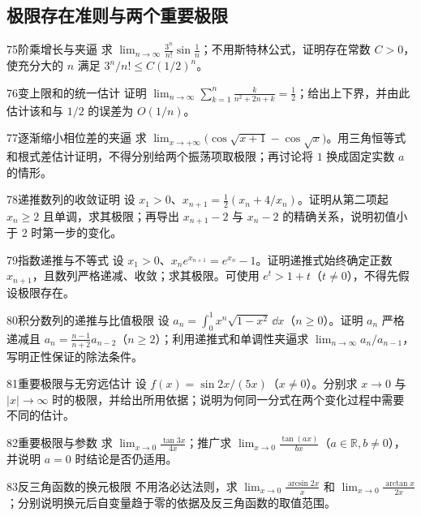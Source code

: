 \subsection{极限存在准则与两个重要极限}
\begin{exercise}{75}{阶乘增长与夹逼}
求 $\lim_{n\to\infty}\frac{3^n}{n!}\sin\frac1n$；不用斯特林公式，证明存在常数 $C>0$，使充分大的 $n$ 满足 $3^n/n!\le C(1/2)^n$。
\end{exercise}
\begin{exercise}{76}{变上限和的统一估计}
证明 $\lim_{n\to\infty}\sum_{k=1}^n\frac{k}{n^2+2n+k}=\frac12$；给出上下界，并由此估计该和与 $1/2$ 的误差为 $O(1/n)$。
\end{exercise}
\begin{exercise}{77}{逐渐缩小相位差的夹逼}
求 $\lim_{x\to+\infty}\bigl(\cos\sqrt{x+1}-\cos\sqrt x\bigr)$。用三角恒等式和根式差估计证明，不得分别给两个振荡项取极限；再讨论将 $1$ 换成固定实数 $a$ 的情形。
\end{exercise}
\begin{exercise}{78}{递推数列的收敛证明}
设 $x_1>0$、$x_{n+1}=\frac12(x_n+4/x_n)$。证明从第二项起 $x_n\ge2$ 且单调，求其极限；再导出 $x_{n+1}-2$ 与 $x_n-2$ 的精确关系，说明初值小于 $2$ 时第一步的变化。
\end{exercise}
\begin{exercise}{79}{指数递推与不等式}
设 $x_1>0$、$x_ne^{x_{n+1}}=e^{x_n}-1$。证明递推式始终确定正数 $x_{n+1}$，且数列严格递减、收敛；求其极限。可使用 $e^t>1+t$（$t\ne0$），不得先假设极限存在。
\end{exercise}
\begin{exercise}{80}{积分数列的递推与比值极限}
设 $a_n=\int_0^1x^n\sqrt{1-x^2}\,\dd x$（$n\ge0$）。证明 $a_n$ 严格递减且 $a_n=\frac{n-1}{n+2}a_{n-2}$（$n\ge2$）；利用递推式和单调性夹逼求 $\lim_{n\to\infty}a_n/a_{n-1}$，写明正性保证的除法条件。
\end{exercise}
\begin{exercise}{81}{重要极限与无穷远估计}
设 $f(x)=\sin2x/(5x)$（$x\ne0$）。分别求 $x\to0$ 与 $|x|\to\infty$ 时的极限，并给出所用依据；说明为何同一分式在两个变化过程中需要不同的估计。
\end{exercise}
\begin{exercise}{82}{重要极限与参数}
求 $\lim_{x\to0}\frac{\tan3x}{4x}$；推广求 $\lim_{x\to0}\frac{\tan(ax)}{bx}$（$a\in\mathbb R,b\ne0$），并说明 $a=0$ 时结论是否仍适用。
\end{exercise}
\begin{exercise}{83}{反三角函数的换元极限}
不用洛必达法则，求 $\lim_{x\to0}\frac{\arcsin2x}{x}$ 和 $\lim_{x\to0}\frac{\arctan x}{2x}$；分别说明换元后自变量趋于零的依据及反三角函数的取值范围。
\end{exercise}
